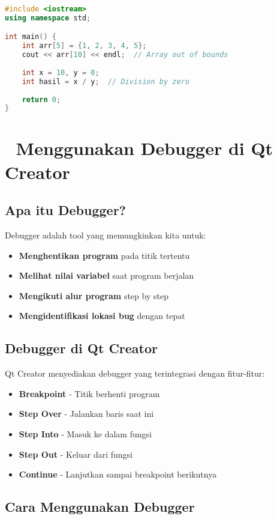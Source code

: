 \begin{lstlisting}[language=c++, caption=Contoh Runtime Error]
#include <iostream>
using namespace std;

int main() {
    int arr[5] = {1, 2, 3, 4, 5};
    cout << arr[10] << endl;  // Array out of bounds
    
    int x = 10, y = 0;
    int hasil = x / y;  // Division by zero
    
    return 0;
}
\end{lstlisting}

\section{🔧 Menggunakan Debugger di Qt Creator}

\subsection{Apa itu Debugger?}

Debugger adalah tool yang memungkinkan kita untuk:
\begin{itemize}
\item \textbf{Menghentikan program} pada titik tertentu
\item \textbf{Melihat nilai variabel} saat program berjalan
\item \textbf{Mengikuti alur program} step by step
\item \textbf{Mengidentifikasi lokasi bug} dengan tepat
\end{itemize}

\subsection{Debugger di Qt Creator}

Qt Creator menyediakan debugger yang terintegrasi dengan fitur-fitur:

\begin{itemize}
\item \textbf{Breakpoint} - Titik berhenti program
\item \textbf{Step Over} - Jalankan baris saat ini
\item \textbf{Step Into} - Masuk ke dalam fungsi
\item \textbf{Step Out} - Keluar dari fungsi
\item \textbf{Continue} - Lanjutkan sampai breakpoint berikutnya
\end{itemize}

\subsection{Cara Menggunakan Debugger}

